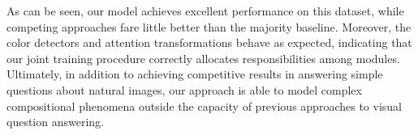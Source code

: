 As can be seen, our model achieves excellent performance on this dataset, while
competing approaches fare little better than the majority baseline. Moreover,
the color detectors and attention transformations behave as expected, indicating
that our joint training procedure correctly allocates responsibilities among
modules. Ultimately, in addition to achieving competitive results in answering
simple questions about natural images, our approach is able to model complex
compositional phenomena outside the capacity of previous approaches to visual
question answering.

